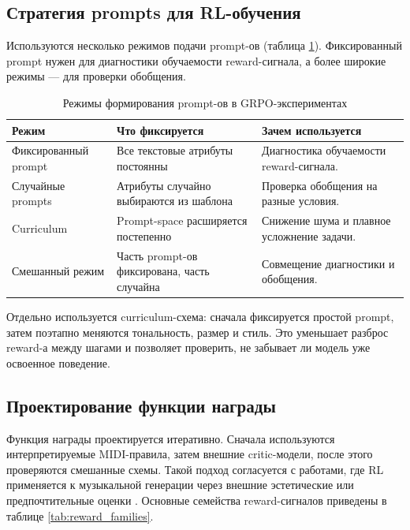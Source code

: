 \documentclass[a4paper,12pt]{extarticle}
\begin{document}
\subsection{Стратегия prompts для RL-обучения}

Используются несколько режимов подачи prompt-ов
(таблица \ref{tab:prompt_regimes}). Фиксированный prompt нужен для
диагностики обучаемости reward-сигнала, а более широкие режимы --- для
проверки обобщения.

\begin{table}[ht]
\centering
\caption{Режимы формирования prompt-ов в GRPO-экспериментах}
\label{tab:prompt_regimes}
\begin{tabular}{p{}p{}p{}}
\toprule
Режим & Что фиксируется & Зачем используется \\
\midrule
Фиксированный prompt & Все текстовые атрибуты постоянны & Диагностика обучаемости reward-сигнала. \\
Случайные prompts & Атрибуты случайно выбираются из шаблона & Проверка обобщения на разные условия. \\
Curriculum & Prompt-space расширяется постепенно & Снижение шума и плавное усложнение задачи. \\
Смешанный режим & Часть prompt-ов фиксирована, часть случайна & Совмещение диагностики и обобщения. \\
\bottomrule
\end{tabular}
\end{table}

Отдельно используется curriculum-схема: сначала фиксируется простой
prompt, затем поэтапно меняются тональность, размер и стиль. Это
уменьшает разброс reward-а между шагами и позволяет проверить, не
забывает ли модель уже освоенное поведение.

\subsection{Проектирование функции награды}

Функция награды проектируется итеративно. Сначала используются
интерпретируемые MIDI-правила, затем внешние critic-модели, после этого
проверяются смешанные схемы. Такой подход согласуется с работами, где
RL применяется к музыкальной генерации через внешние эстетические или
предпочтительные оценки \cite{rlduet2020,musicrl2024,jonason2025smart}.
Основные семейства reward-сигналов приведены в таблице
\ref{tab:reward_families}.
\end{document}
